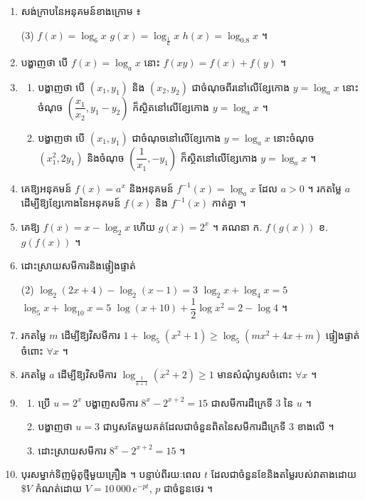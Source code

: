 \begin{enumerate}[1]
  \item សង់ក្រាបនៃអនុគមន៍ខាងក្រោម ៖
  \begin{tasks}(3)
    \task $f(x) = \log_6 x$
    \task $g(x) = \log_{\frac{1}{6}} x$
    \task $h(x) = \log_{0.8} x$ ។
  \end{tasks}
  \item បង្ហាញថា បើ $f(x) = \log_a x$ នោះ $f(xy) = f(x) + f(y)$ ។
  \item
  \begin{enumerate}[a]
    \item បង្ហាញថា បើ $(x_1, y_1)$ និង $(x_2, y_2)$ ជាចំណុចពីរនៅលើខ្សែកោង $y = \log_a x$ នោះចំណុច $\left(\dfrac{x_1}{x_2}, y_1 - y_2\right)$ ក៏ស្ថិតនៅលើខ្សែកោង $y = \log_a x$ ។
    \item បង្ហាញថា បើ $(x_1, y_1)$ ជាចំណុចនៅលើខ្សែកោង $y = \log_a x$ នោះចំណុច $(x_1^2, 2y_1)$ និងចំណុច $\left(\dfrac{1}{x_1}, -y_1\right)$ ក៏ស្ថិតនៅលើខ្សែកោង $y = \log_a x$ ។
  \end{enumerate}
  \item គេឱ្យអនុគមន៍ $f(x) = a^x$ និងអនុគមន៍ $f^{-1}(x) = \log_a x$ ដែល $a > 0$ ។ រកតម្លៃ $a$ ដើម្បីឱ្យខ្សែកោងនៃអនុគមន៍ $f(x)$ និង $f^{-1}(x)$ កាត់គ្នា ។
  \item គេឱ្យ $f(x) = x - \log_2 x$ ហើយ $g(x) = 2^x$ ។ គណនា \quad ក. $f(g(x))$ \qquad ខ. $g(f(x))$ ។
  \item ដោះស្រាយសមីការនិងផ្ទៀងផ្ទាត់
  \begin{tasks}(2)
    \task $\log_2(2x + 4) - \log_2(x - 1) = 3$
    \task $\log_2 x + \log_4 x = 5$
    \task $\log_5 x + \log_{10} x = 5$
    \task $\log(x + 10) + \dfrac{1}{2}\log x^2 = 2 - \log 4$ ។
  \end{tasks}
  \item រកតម្លៃ $m$ ដើម្បីឱ្យវិសមីការ $1 + \log_5(x^2 + 1) \ge \log_5(mx^2 + 4x + m)$ ផ្ទៀងផ្ទាត់ចំពោះ $\forall x$ ។
  \item រកតម្លៃ $a$ ដើម្បីឱ្យវិសមីការ $\log_{\frac{1}{a+1}}(x^2 + 2) \ge 1$ មានសំណុំឫសចំពោះ $\forall x$ ។
  \item
  \begin{enumerate}[a]
    \item ប្រើ $u = 2^x$ បង្ហាញសមីការ $8^x - 2^{x+2} = 15$ ជាសមីការដឺក្រេទី $3$ នៃ $u$ ។
    \item បង្ហាញថា $u = 3$ ជាឫសតែមួយគត់ដែលជាចំនួនពិតនៃសមីការដឺក្រេទី $3$ ខាងលើ ។
    \item ដោះស្រាយសមីការ $8^x - 2^{x+2} = 15$ ។
  \end{enumerate}
  \item បុរសម្នាក់ទិញម៉ូតូថ្មីមួយគ្រឿង ។ បន្ទាប់ពីរយៈពេល $t$ ដែលជាចំនួនខែនិងតម្លៃរបស់វាតាងដោយ $\$V$ កំណត់ដោយ $V = 10\,000\,e^{-pt}$, $p$ ជាចំនួនថេរ ។

\end{enumerate}
